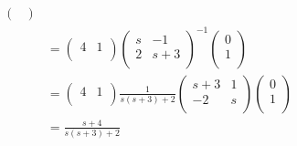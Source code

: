 \begin{itemize}
\begin{ex}{}
\begin{equation*}
\begin{aligned}
\begin{pmatrix}
    \end{pmatrix}\\
    &=\begin{pmatrix}
     4 & 1\\
    \end{pmatrix}
    \begin{pmatrix}
    s&-1\\
    2&s+3\\
    \end{pmatrix}
    ^{-1}
    \begin{pmatrix}
    0\\
    1\\
    \end{pmatrix}\\
    &=\begin{pmatrix}
     4 & 1\\
    \end{pmatrix}
    \frac{1}{s(s+3)+2}
    \begin{pmatrix}
    s+3&1\\
    -2&s\\
    \end{pmatrix}
    \begin{pmatrix}
    0\\
    1\\
    \end{pmatrix}\\
    &= \frac{s+4}{s(s+3)+2}
    \end{aligned}
    \end{equation*}
    \end{ex}



\end{itemize}
